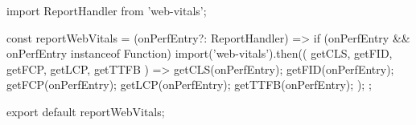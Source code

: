 import { ReportHandler } from 'web-vitals';

const reportWebVitals = (onPerfEntry?: ReportHandler) => {
  if (onPerfEntry && onPerfEntry instanceof Function) {
    import('web-vitals').then(({ getCLS, getFID, getFCP, getLCP, getTTFB }) => {
      getCLS(onPerfEntry);
      getFID(onPerfEntry);
      getFCP(onPerfEntry);
      getLCP(onPerfEntry);
      getTTFB(onPerfEntry);
    });
  }
};

export default reportWebVitals;